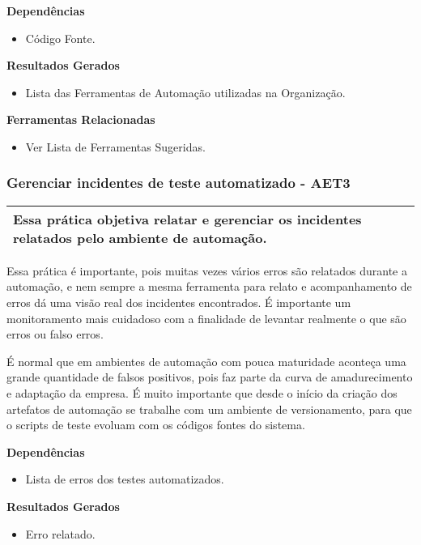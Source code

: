 \textbf{Dependências}
\begin{itemize}
    \item Código Fonte.
\end{itemize}

\textbf{Resultados Gerados}
\begin{itemize}
    \item Lista das Ferramentas de Automação utilizadas na Organização.
\end{itemize}

\textbf{Ferramentas Relacionadas}
\begin{itemize}
    \item Ver Lista de Ferramentas Sugeridas.
\end{itemize}


\subsubsection{ Gerenciar incidentes de teste automatizado - AET3}
\label{sec:aet3}

\begin{table}[!ht]
\centering
\begin{tabular}{|p{130mm}|}
\hline
Essa prática objetiva relatar e gerenciar os incidentes relatados pelo ambiente de automação. \\ 
\hline
\end{tabular}
\end{table}

Essa prática é importante, pois muitas vezes vários erros são relatados durante a automação, e nem sempre a mesma ferramenta para relato e acompanhamento de erros dá uma visão real dos incidentes encontrados. É importante um monitoramento mais cuidadoso com a finalidade de levantar realmente o que são erros ou falso erros.

É normal que em ambientes de automação com pouca maturidade aconteça uma grande quantidade de falsos positivos, pois faz parte da curva de amadurecimento e adaptação da empresa. É muito importante que desde o início da criação dos artefatos de automação se trabalhe com um ambiente de versionamento, para que o scripts de teste evoluam com os códigos fontes do sistema.

\textbf{Dependências}
\begin{itemize}
    \item Lista de erros dos testes automatizados.
\end{itemize}

\textbf{ Resultados Gerados}
\begin{itemize}
    \item Erro relatado.
\end{itemize}

